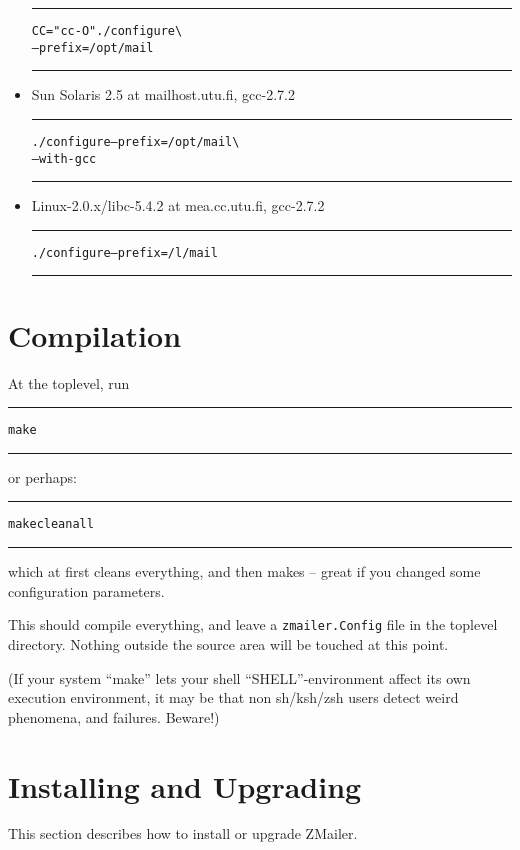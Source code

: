 \begin{multicols}{2}
\begin{itemize}
\begin{alltt}\hrule\medskip
CC="cc -O" ./configure            \verb/\/
              --prefix=/opt/mail
\medskip\hrule\end{alltt}

\item Sun Solaris 2.5  at mailhost.utu.fi, gcc-2.7.2

\begin{alltt}\hrule\medskip
./configure --prefix=/opt/mail    \verb/\/
       --with-gcc
\medskip\hrule\end{alltt}

\item Linux-2.0.x/libc-5.4.2 at mea.cc.utu.fi, gcc-2.7.2

\begin{alltt}\hrule\medskip
./configure --prefix=/l/mail
\medskip\hrule\end{alltt}
\end{itemize}


\section{Compilation}

At the toplevel, run
\nopagebreak
\begin{alltt}\medskip\hrule\medskip
  make
\medskip\hrule\medskip\end{alltt}

or perhaps:
\nopagebreak
\begin{alltt}\medskip\hrule\medskip
  make clean all
\medskip\hrule\medskip\end{alltt}

which at first cleans everything, and then makes -- great if you
changed some configuration parameters.

This should compile everything, and leave a {\tt zmailer.Config} file in
the toplevel directory.  Nothing outside the source area will be
touched at this point.

(If your system ``make'' lets your shell ``SHELL''-environment
affect its own execution environment, it may be that non sh/ksh/zsh
users detect weird phenomena, and failures. Beware!)


\section{Installing and Upgrading}

This section describes how to install or upgrade ZMailer.



\end{multicols}
